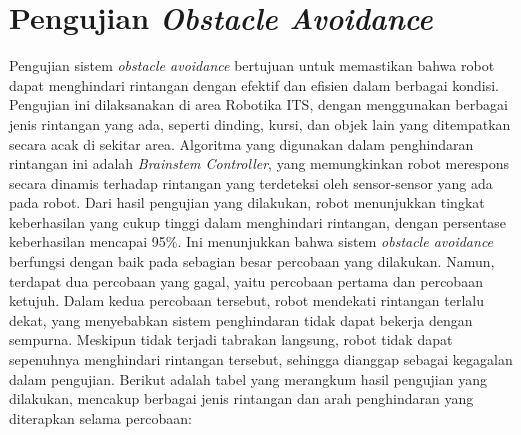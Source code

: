 
\section{Pengujian \emph{Obstacle Avoidance}}

Pengujian sistem \emph{obstacle avoidance} bertujuan untuk memastikan bahwa robot dapat menghindari rintangan dengan efektif dan efisien dalam berbagai kondisi. Pengujian ini dilaksanakan di area Robotika ITS, dengan menggunakan berbagai jenis rintangan yang ada, seperti dinding, kursi, dan objek lain yang ditempatkan secara acak di sekitar area. Algoritma yang digunakan dalam penghindaran rintangan ini adalah \emph{Brainstem Controller}, yang memungkinkan robot merespons secara dinamis terhadap rintangan yang terdeteksi oleh sensor-sensor yang ada pada robot.  Dari hasil pengujian yang dilakukan, robot menunjukkan tingkat keberhasilan yang cukup tinggi dalam menghindari rintangan, dengan persentase keberhasilan mencapai 95\%. Ini menunjukkan bahwa sistem \emph{obstacle avoidance} berfungsi dengan baik pada sebagian besar percobaan yang dilakukan. Namun, terdapat dua percobaan yang gagal, yaitu percobaan pertama dan percobaan ketujuh. Dalam kedua percobaan tersebut, robot mendekati rintangan terlalu dekat, yang menyebabkan sistem penghindaran tidak dapat bekerja dengan sempurna. Meskipun tidak terjadi tabrakan langsung, robot tidak dapat sepenuhnya menghindari rintangan tersebut, sehingga dianggap sebagai kegagalan dalam pengujian.  Berikut adalah tabel yang merangkum hasil pengujian yang dilakukan, mencakup berbagai jenis rintangan dan arah penghindaran yang diterapkan selama percobaan:

